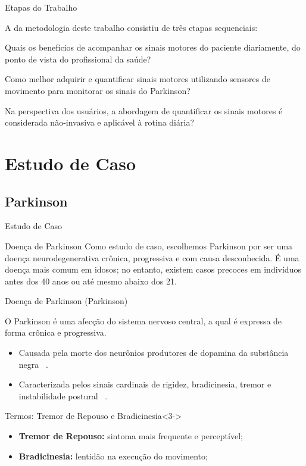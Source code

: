 \documentclass{beamer}
\begin{document}
\begin{frame}{Etapas do Trabalho}
	\begin{block}{}
	  A da metodologia deste trabalho consistiu de três etapas sequenciais:
		  \begin{description}[<+->]
		  \item[ETAPA 1] Quais os benefícios de acompanhar os sinais motores do paciente diariamente, do ponto de vista do profissional da saúde?
		  \item[ETAPA 2] Como melhor adquirir e quantificar sinais motores utilizando sensores de movimento para monitorar os sinais do Parkinson?
		  \item[ETAPA 3] Na perspectiva dos usuários, a abordagem de quantificar os sinais motores é considerada não-invasiva e aplicável à rotina diária?
		  \end{description}
	\end{block}
\end{frame}

\section{Estudo de Caso}
\subsection{Parkinson}
\begin{frame}{Estudo de Caso}
  \begin{block}{Doença de Parkinson}
   Como estudo de caso, escolhemos Parkinson por ser uma doença neurodegenerativa crônica, progressiva e com causa desconhecida. É uma doença mais comum em idosos; no
entanto, existem casos precoces em indivíduos antes dos 40 anos ou até mesmo abaixo dos 21.
  \end{block}
\end{frame}


\begin{frame}{Doença de Parkinson (Parkinson)}
  \begin{block}{}
    O Parkinson é uma afecção do sistema nervoso central, a qual é expressa de forma crônica e progressiva. 
      \begin{itemize}[<+->]
       \item Causada pela morte dos neurônios produtores de dopamina da substância negra ~\cite{protpar010}. 
       \item Caracterizada pelos sinais cardinais de rigidez, bradicinesia, tremor e instabilidade postural ~\cite{jankovic2008}.
      \end{itemize}
  \end{block}
  \begin{block}{Termos: Tremor de Repouso e Bradicinesia}<3->
      \begin{itemize}
       \item \textbf{Tremor de Repouso:} sintoma mais frequente e perceptível;
       \item \textbf{Bradicinesia:} lentidão na execução do movimento;
      \end{itemize}
  \end{block}
\end{frame}
\end{document}
